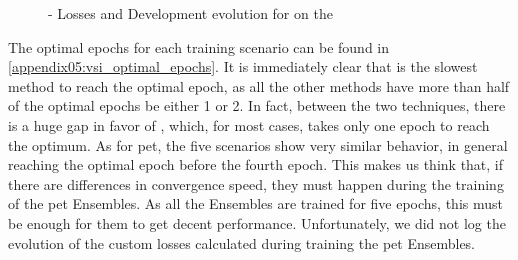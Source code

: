 \begin{figure}[ht]
    \centering
    \hfill
    \hfill
    \caption{\petThousand{} - Losses and Development \fTwo{} evolution for \bertroberta{} on the \trafilaturaTitle{}}
    \label{fig:07_vsi_sample_training_logs_pet_1000}
\end{figure}


The optimal epochs for each training scenario can be found in \appendixname{} \ref{appendix05:vsi_optimal_epochs}. It is immediately clear that \unbalanced{} is the slowest method to reach the optimal epoch, as all the other methods have more than half of the optimal epochs be either 1 or 2. In fact, between the two \finetuning{} techniques, there is a huge gap in favor of \balanced{}, which, for most cases, takes only one epoch to reach the optimum. As for \gls{pet}, the five scenarios show very similar behavior, in general reaching the optimal epoch before the fourth epoch. This makes us think that, if there are differences in convergence speed, they must happen during the training of the \gls{pet} Ensembles. As all the Ensembles are trained for five epochs, this must be enough for them to get decent performance. Unfortunately, we did not log the evolution of the custom losses calculated during training the \gls{pet} Ensembles.


